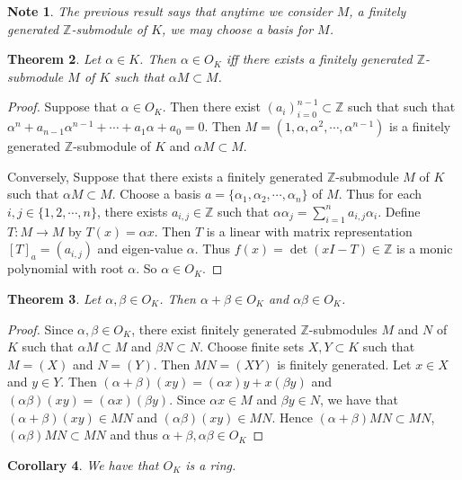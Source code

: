 \documentclass[12pt]{amsart}
\newtheorem{thm}{Theorem}[section]
\newtheorem{cor}[thm]{Corollary}
\newtheorem{note}[thm]{Note}
\newcommand{\al}{\alpha}
\newcommand{\Z}{\mathbb{Z}}
\begin{document}
\begin{note}
The previous result says that anytime we consider $M$, a finitely generated $\Z$-submodule of $K$, we may choose a basis for $M$. 
\end{note}

\begin{thm}
Let $\al \in K$. Then $\al \in O_K$ iff there exists a finitely generated $\Z$-submodule $M$ of $K$ such that $\al M \subset M$. 
\end{thm}

\begin{proof}
Suppose that $\al \in O_K$. Then there exist $(a_{i})_{i=0}^{n-1} \subset \Z$ such that such that $\al^n + a_{n-1}\al^{n-1}+ \cdots+a_1\al + a_0 = 0$. Then $M = (1, \al, \al^2, \cdots, \al^{n-1})$ is a finitely generated $\Z$-submodule of $K$ and $\al M \subset M$.

Conversely, Suppose that there exists a finitely generated $\Z$-submodule $M$ of $K$ such that $\al M \subset M$. Choose a basis $a=\{\al_1, \al_2, \cdots, \al_n\}$ of $M$. Thus for each $i,j \in \{1,2,\cdots, n\}$, there exists $a_{i,j} \in \Z$ such that $\al \al_j = \sum\limits_{i=1}^na_{i,j}\al_i$. Define $T:M \rightarrow M$ by $T(x) = \al x$. Then $T$ is a linear with matrix representation $[T]_a = (a_{i,j})$ and eigen-value $\al$. Thus $f(x) = \det(xI-T) \in \Z$ is a monic polynomial with root $\al$. So $\al \in O_K$.   
\end{proof}

\begin{thm}
Let $\al, \beta \in O_K$. Then $\al + \beta \in O_K$ and $\al \beta \in O_K$.
\end{thm}

\begin{proof}
Since $\al,\beta \in O_K$, there exist finitely generated $\Z$-submodules $M$ and $N$ of $K$ such that $\al M \subset M$ and $\beta N \subset N$. Choose finite sets $X,Y \subset K$ such that $M = (X)$ and $N=(Y)$. Then $MN = (XY)$ is finitely generated. Let $x \in X$ and $y \in Y$. Then $(\al+\beta)(xy) = (\al x)y+x(\beta y)$ and $(\al \beta)(xy) = (\al x)(\beta y)$. Since $\al x \in M$ and $\beta y \in N$, we have that $(\al+\beta)(xy) \in MN$ and $(\al \beta)(xy) \in MN$. Hence $(\al + \beta)MN \subset MN$, $(\al \beta)MN \subset MN$ and thus $\al+\beta, \al \beta \in O_K$
\end{proof}

\begin{cor}
We have that $O_K$ is a ring.
\end{cor}
\end{document}
